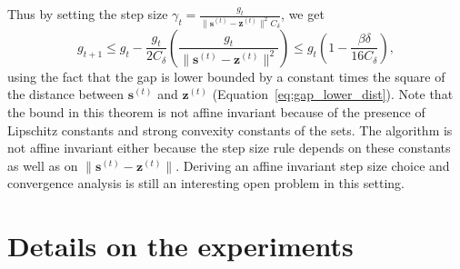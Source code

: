 \documentclass[twoside]{article}
\newcommand{\zt}{\bm{z}^{(t)}}
\newcommand{\st}{\bm{s}^{(t)}}
\newcommand{\gap}{g_{t}}
\newcommand{\stepsize}{\gamma}
\newcommand{\0}{\mathbf{0}} %
\begin{document}
      Thus by setting the step size $\stepsize_t = \frac{\gap}{\|\st - \zt\|^2 C_\delta}$,
       we get 
     \begin{equation}
        g_{t+1} \leq \gap - \frac{\gap}{2 C_\delta} \left( \frac{\gap}{\|\st-\zt\|^2} \right) \leq \gap \left( 1- \frac{\beta \delta}{16 C_\delta} \right), 
     \end{equation}
     using the fact that the gap is lower bounded by a constant times the square of the distance between $\st$ and $\zt$ (Equation~\eqref{eq:gap_lower_dist}).
    \endproof
    Note that the bound in this theorem is not affine invariant because of the presence of Lipschitz constants and strong convexity constants of the sets. The algorithm is not affine invariant either because the step size rule depends on these constants as well as on $\|\st-\zt\|$. Deriving an affine invariant step size choice and convergence analysis is still an interesting open problem in this setting.

\section{Details on the experiments} %
\label{sec:details_on_the_experiments}
\end{document}
